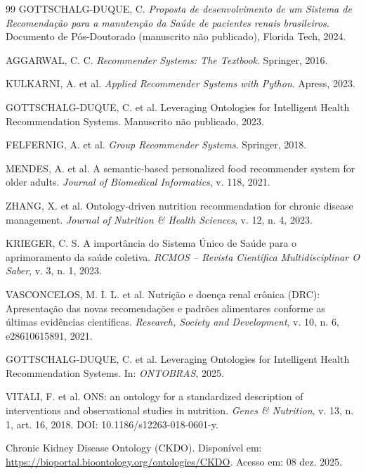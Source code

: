 \documentclass[12pt, a4paper, twocolumn]{article}
\begin{document}
\begin{thebibliography}{99}
    GOTTSCHALG-DUQUE, C. \textit{Proposta de desenvolvimento de um Sistema de Recomendação para a manutenção da Saúde de pacientes renais brasileiros}. Documento de Pós-Doutorado (manuscrito não publicado), Florida Tech, 2024.

    AGGARWAL, C. C. \textit{Recommender Systems: The Textbook}. Springer, 2016.

    KULKARNI, A. et al. \textit{Applied Recommender Systems with Python}. Apress, 2023.

    GOTTSCHALG-DUQUE, C. et al. Leveraging Ontologies for Intelligent Health Recommendation Systems. Manuscrito não publicado, 2023.

    FELFERNIG, A. et al. \textit{Group Recommender Systems}. Springer, 2018.

    MENDES, A. et al. A semantic-based personalized food recommender system for older adults. \textit{Journal of Biomedical Informatics}, v. 118, 2021.

    ZHANG, X. et al. Ontology-driven nutrition recommendation for chronic disease management. \textit{Journal of Nutrition \& Health Sciences}, v. 12, n. 4, 2023.

    KRIEGER, C. S. A importância do Sistema Único de Saúde para o aprimoramento da saúde coletiva. \textit{RCMOS -- Revista Científica Multidisciplinar O Saber}, v. 3, n. 1, 2023.

    VASCONCELOS, M. I. L. et al. Nutrição e doença renal crônica (DRC): Apresentação das novas recomendações e padrões alimentares conforme as últimas evidências científicas. \textit{Research, Society and Development}, v. 10, n. 6, e28610615891, 2021.

    GOTTSCHALG-DUQUE, C. et al. Leveraging Ontologies for Intelligent Health Recommendation Systems. In: \textit{ONTOBRAS}, 2025.

    VITALI, F. et al. ONS: an ontology for a standardized description of interventions and observational studies in nutrition. \textit{Genes \& Nutrition}, v. 13, n. 1, art. 16, 2018. DOI: 10.1186/s12263-018-0601-y.

    Chronic Kidney Disease Ontology (CKDO). Disponível em: \url{https://bioportal.bioontology.org/ontologies/CKDO}. Acesso em: 08 dez. 2025.


\end{thebibliography}
\end{document}
